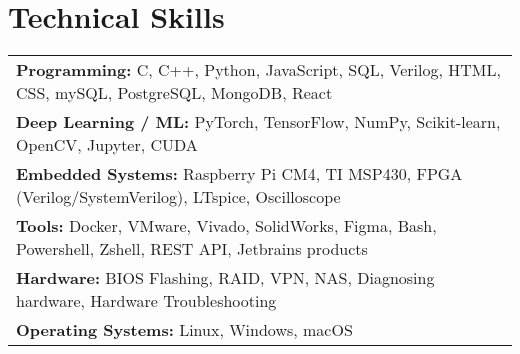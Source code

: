 \documentclass[letterpaper,11pt]{article}
\begin{document}
\section*{Technical Skills}
\begin{tabularx}{\textwidth}{X}
\textbf{Programming:} C, C++, Python, JavaScript, SQL, Verilog, HTML, CSS, mySQL, PostgreSQL, MongoDB, React\\
\textbf{Deep Learning / ML:} PyTorch, TensorFlow, NumPy, Scikit-learn, OpenCV, Jupyter, CUDA \\
\textbf{Embedded Systems:} Raspberry Pi CM4, TI MSP430, FPGA (Verilog/SystemVerilog), LTspice, Oscilloscope\\
\textbf{Tools:} Docker, VMware, Vivado, SolidWorks, Figma, Bash, Powershell, Zshell, REST API, Jetbrains products\\ 
\textbf{Hardware:} BIOS Flashing, RAID, VPN, NAS, Diagnosing hardware, Hardware Troubleshooting \\
\textbf{Operating Systems:} Linux, Windows, macOS \\
\end{tabularx}
\end{document}
